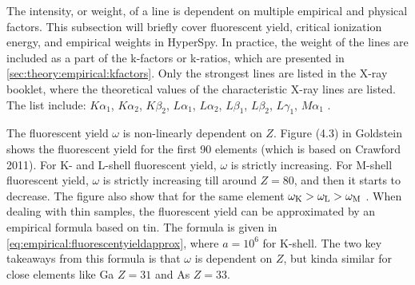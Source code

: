 
The intensity, or weight, of a line is dependent on multiple empirical and physical factors.
This subsection will briefly cover fluorescent yield, critical ionization energy, and empirical weights in HyperSpy.
In practice, the weight of the lines are included as a part of the k-factors or k-ratios, which are presented in \cref{sec:theory:empirical:kfactors}.
Only the strongest lines are listed in the X-ray booklet, where the theoretical values of the characteristic X-ray lines are listed.
The list include: $K\alpha_1$, $K\alpha_2$, $K\beta_2$, $L\alpha_1$, $L\alpha_2$, $L\beta_1$, $L\beta_2$, $L\gamma_1$, $M\alpha_1$ \cite{thompson_x-ray_2004}.

The fluorescent yield $\omega$ is non-linearly dependent on $Z$.
Figure (4.3)  in Goldstein \cite{goldstein_scanning_2018}  shows the fluorescent yield for the first 90 elements (which is based on Crawford 2011).
For K- and L-shell fluorescent yield, $\omega$ is strictly increasing.
For M-shell fluorescent yield, $\omega$ is strictly increasing till around $Z=80$, and then it starts to decrease.
The figure also show that for the same element $\omega_{\textnormal{K}}  > \omega_{\textnormal{L}} > \omega_{\textnormal{M}}$ .
When dealing with thin samples, the fluorescent yield can be approximated by an empirical formula based on tin.
The formula is given in \cref{eq:empirical:fluorescentyieldapprox}, where $a=10^6$ for K-shell. 
The two key takeaways from this formula is that $\omega$ is dependent on $Z$, but kinda similar for close elements like Ga $Z = 31$ and As $Z = 33$.



